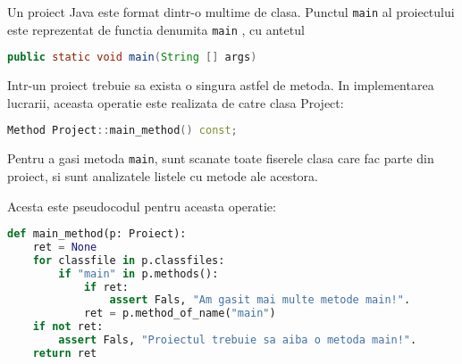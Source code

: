 Un proiect Java este format dintr-o multime de clasa.
Punctul \texttt{main} al proiectului este reprezentat de functia
denumita \texttt{main} \cite{java_main}, cu antetul

\begin{lstlisting}[language=Java]
public static void main(String [] args)
\end{lstlisting}

Intr-un proiect trebuie sa exista o singura astfel de metoda.
In implementarea lucrarii, aceasta operatie este realizata de
catre clasa Project:
\begin{lstlisting}[language=C++]
Method Project::main_method() const;
\end{lstlisting}

Pentru a gasi metoda \texttt{main}, sunt scanate toate fiserele
clasa care fac parte din proiect, si sunt analizatele listele cu
metode ale acestora.

Acesta este pseudocodul pentru aceasta operatie:
\begin{lstlisting}[language=Python]
def main_method(p: Proiect):
    ret = None
    for classfile in p.classfiles:
        if "main" in p.methods():
            if ret:
                assert Fals, "Am gasit mai multe metode main!".
            ret = p.method_of_name("main")
    if not ret:
        assert Fals, "Proiectul trebuie sa aiba o metoda main!".
    return ret
\end{lstlisting}

